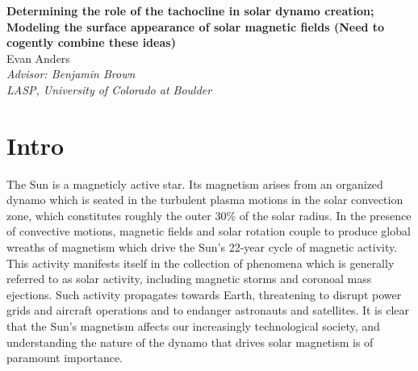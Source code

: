 \documentclass[aasms,12pt]{article}
\begin{document}
\begin{center}
   \Large\textbf{Determining the role of the tachocline in solar
	dynamo creation; Modeling the surface appearance of solar magnetic
	fields (Need to cogently combine these ideas)}\\
   \vspace{0.4cm}
   \large{Evan Anders}\\
   \vspace{0.4cm}
   \normalsize\textit{Advisor: Benjamin Brown}\\
   \normalsize\textit{LASP, University of Colorado at Boulder}\\
\end{center}






\section{Intro}
The Sun is a magneticly active star.  Its magnetism arises from an 
organized dynamo which is seated in the turbulent plasma
motions in the solar convection zone, which constitutes roughly the outer 30\%
of the solar radius.  In the presence of
convective motions, magnetic fields and solar rotation couple to produce global
wreaths of magnetism which drive the Sun's 22-year cycle of magnetic activity.
This activity manifests itself in the collection of phenomena which is generally
referred to as solar activity, including magnetic storms and coronoal mass
ejections.  Such activity propagates towards Earth, threatening to disrupt power
grids and aircraft operations and to endanger astronauts and satellites.  It is
clear that the Sun's magnetism affects our increasingly technological society,
and understanding the nature of the dynamo that drives solar magnetism is of
paramount importance.
\end{document}
